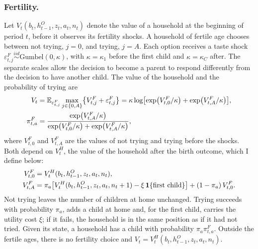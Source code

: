 \subsubsection*{Fertility.}
Let $V_t(b_t,h^O_{t-1},z_t,a_t,n_t)$ denote the value of a household at the
beginning of period $t$, before it observes its fertility shocks. A household
of fertile age chooses between not trying, $j=0$, and trying, $j=A$. Each
option receives a taste shock
$\varepsilon^F_{t,j}\overset{iid}{\sim}\text{Gumbel}(0,\kappa)$, with
$\kappa=\kappa_1$ before the first child and $\kappa=\kappa_C$ after. The
separate scales allow the decision to become a parent to respond differently
from the decision to have another child. The value of the household and the
probability of trying are
\begin{equation}
\begin{aligned}
 V_t&=\mathbb E_{\varepsilon^F_{t,j}}\max_{j\in\{0,A\}}\bigl\{V^F_{t,j}+\varepsilon^F_{t,j}\bigr\}
 =\kappa\log\bigl[\exp\bigl(V^F_{t,0}/\kappa\bigr)+\exp\bigl(V^F_{t,A}/\kappa\bigr)\bigr],\\
 \pi^F_{t,a}&=\frac{\exp\bigl(V^F_{t,A}/\kappa\bigr)}{\exp\bigl(V^F_{t,0}/\kappa\bigr)+\exp\bigl(V^F_{t,A}/\kappa\bigr)},
\end{aligned}
 \label{eq:m-fertility}
\end{equation}
where $V^F_{t,0}$ and $V^F_{t,A}$ are the values of not trying and trying
before the shocks. Both depend on $V^H_t$, the value of the household after the
birth outcome, which I define below:
\begin{equation*}
\begin{aligned}
 V^F_{t,0}&=V^H_t(b_t,h^O_{t-1},z_t,a_t,n_t),\\
 V^F_{t,A}&=\pi_a\bigl[V^H_t(b_t,h^O_{t-1},z_t,a_t,n_t+1)-\xi\,\mathbf 1\{\text{first child}\}\bigr]+(1-\pi_a)\,V^F_{t,0}.
\end{aligned}
\end{equation*}
Not trying leaves the number of children at home unchanged. Trying succeeds
with probability $\pi_a$, adds a child at home and, for the first child,
carries the utility cost $\xi$; if it fails, the household is in the same
position as if it had not tried. Given its state, a household has a child
with probability $\pi_a\pi^F_{t,a}$. Outside the fertile ages, there is no
fertility choice and $V_t=V^H_t(b_t,h^O_{t-1},z_t,a_t,n_t)$.


